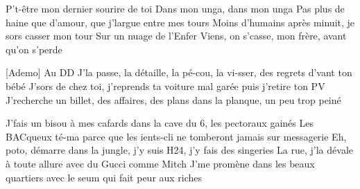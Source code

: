 \begin{guitar}
P't-être mon dernier sourire de toi
Dans mon unga, dans mon unga
Pas plus de haine que d'amour, que j'largue entre mes tours
Moins d'humains après minuit, je sors casser mon tour
Sur un nuage de l'Enfer
Viens, on s'casse, mon frère, avant qu'on s'perde

[Ademo]
Au DD
J'la passe, la détaille, la pé-cou, la vi-sser, des regrets d'vant ton bébé
J'sors de chez toi, j'reprends ta voiture mal garée puis j'retire ton PV
J'recherche un billet, des affaires, des plans dans la planque, un peu trop peiné

J'fais un bisou à mes cafards dans la cave du 6, les pectoraux gainés
Les BACqueux té-ma parce que les ients-cli ne tomberont jamais sur messagerie
Eh, poto, démarre dans la jungle, j'y suis H24, j'y fais des singeries
La rue, j'la dévale à toute allure avec du Gucci comme Mitch
J'me promène dans les beaux quartiers avec le seum qui fait peur aux riches
\end{guitar} 